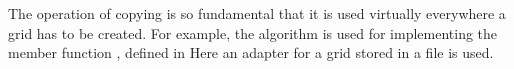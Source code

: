 
The operation of copying is so fundamental that
it is used virtually everywhere a grid has to be created.
For example, the algorithm is used for implementing 
the member function , 
defined in 
Here an adapter 
for a grid stored in a file is used.


